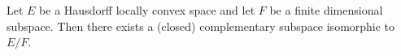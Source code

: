 Let $E$ be a Hausdorff locally convex space and let $F$ be a finite dimensional subspace. Then there exists a (closed) complementary subspace isomorphic to $E/F$.
